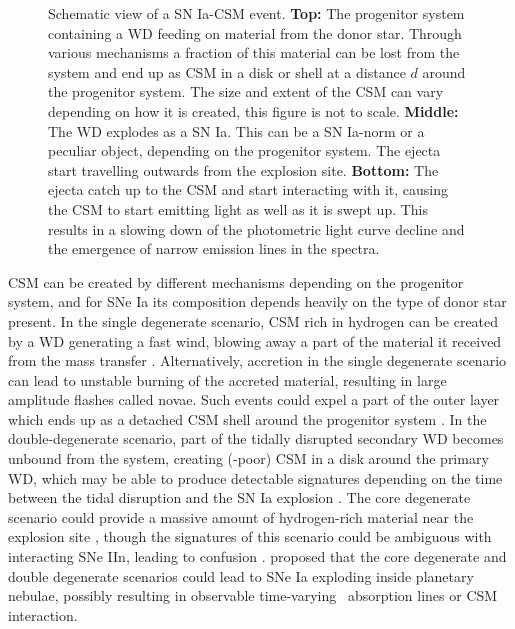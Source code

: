 \documentclass[a4paper,oneside,12pt, class=Latex/Classes/PhDthesisPSnPDF, crop=false]{standalone}
\begin{document}
\begin{figure}
    \caption[Schematic view of a SN Ia-CSM event.]{Schematic view of a SN Ia-CSM event. \textbf{Top:} The progenitor system containing a WD feeding on material from the donor star. Through various mechanisms a fraction of this material can be lost from the system and end up as CSM in a disk or shell at a distance $d$ around the progenitor system. The size and extent of the CSM can vary depending on how it is created, this figure is not to scale. \textbf{Middle:} The WD explodes as a SN Ia. This can be a SN Ia-norm or a peculiar object, depending on the progenitor system. The ejecta start travelling outwards from the explosion site. \textbf{Bottom:} The ejecta catch up to the CSM and start interacting with it, causing the CSM to start emitting light as well as it is swept up. This results in a slowing down of the photometric light curve decline and the emergence of narrow emission lines in the spectra.}
    \label{Ia-CSM_mod}
\end{figure}

CSM can be created by different mechanisms depending on the progenitor system, and for SNe Ia its composition depends heavily on the type of donor star present. In the single degenerate scenario, CSM rich in hydrogen can be created by a WD generating a fast wind, blowing away a part of the material it received from the mass transfer \citep{single_degen_CSM_gen}. Alternatively, accretion in the single degenerate scenario can lead to unstable burning of the accreted material, resulting in large amplitude flashes called novae. Such events could expel a part of the outer layer which ends up as a detached CSM shell around the progenitor system \citep[e.g.][]{ptf11kx, accreting_WDs}. In the double-degenerate scenario, part of the tidally disrupted secondary WD becomes unbound from the system, creating (-poor) CSM in a disk around the primary WD, which may be able to produce detectable signatures depending on the time between the tidal disruption and the SN Ia explosion \citep{Double_degen_CSM_gen}. The core degenerate scenario could provide a massive amount of hydrogen-rich material near the explosion site \citep[e.g. for SN 2014J,][]{2014J_core_deg}, though the signatures of this scenario could be ambiguous with interacting SNe IIn, leading to confusion \citep{Inserra_2016}. \citet{snips} proposed that the core degenerate and double degenerate scenarios could lead to SNe Ia exploding inside planetary nebulae, possibly resulting in observable time-varying \NaID\ absorption lines or CSM interaction.
\end{document}
